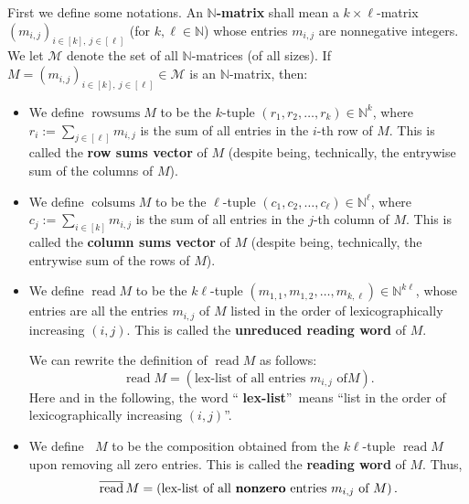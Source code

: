 \documentclass[12pt]{article}
\theoremstyle{definition}%
\theoremstyle{definition}%
\theoremstyle{remark}%
\newcommand{\interval}[1]{\left[ #1 \right]} %
\newcommand{\CM}{\mathcal{M}}
\newcommand{\rowsums}{\operatorname{rowsums}}
\newcommand{\colsums}{\operatorname{colsums}}
\newcommand{\readw}{\operatorname{read}}
\newcommand{\readb}{\mathop{\overline{\operatorname{read}}}}
\newcommand{\defin}[1]{\textbf{#1}}
\begin{document}
First we define some notations. An \defin{$\mathbb{N}$-matrix} shall mean a
$k\times\ell$-matrix $\left(  m_{i,j}\right)  _{i\in\interval{k}
,\ j\in\interval{\ell}}$ (for $k,\ell\in\mathbb{N}$) whose entries
$m_{i,j}$ are nonnegative integers. We let \defin{$\CM$} denote the set of all
$\mathbb{N}$-matrices (of all sizes). If $M=\left(  m_{i,j}\right)
_{i\in\interval{k}  ,\ j\in\interval{\ell}}\in\CM$ is an
$\mathbb{N}$-matrix, then:

\begin{itemize}
\item We define \defin{$\rowsums M$} to be the $k$-tuple $\left(
r_{1},r_{2},\ldots,r_{k}\right)  \in\mathbb{N}^{k}$, where $r_{i}:=\sum
_{j\in\interval{\ell}}m_{i,j}$ is the sum of all entries in the $i$-th
row of $M$. This is called the \defin{row sums vector} of $M$ (despite being,
technically, the entrywise sum of the columns of $M$).

\item We define \defin{$\colsums M$} to be the $\ell$-tuple $\left(
c_{1},c_{2},\ldots,c_{\ell}\right)  \in\mathbb{N}^{\ell}$, where $c_{j}
:=\sum_{i\in\interval{k}  }m_{i,j}$ is the sum of all entries in the
$j$-th column of $M$. This is called the \defin{column sums vector} of $M$
(despite being, technically, the entrywise sum of the rows of $M$).

\item We define \defin{$\readw M$} to be the $k\ell$-tuple $\left(
m_{1,1},m_{1,2},\ldots,m_{k,\ell}\right)  \in\mathbb{N}^{k\ell}$, whose
entries are all the entries $m_{i,j}$ of $M$ listed in the order of
lexicographically increasing $\left(  i,j\right)  $. This is called the
\defin{unreduced reading word} of $M$.

We can rewrite the definition of $\readw M$ as follows:
\begin{equation}
\readw M=\left(  \text{lex-list of all entries }m_{i,j}\text{ of
}M\right)  .
\label{eq.smf.readM=lex}
\end{equation}
Here and in the following, the word \textquotedblleft
\defin{lex-list}\textquotedblright\ means \textquotedblleft list in the order of
lexicographically increasing $\left(  i,j\right)  $\textquotedblright.

\item We define \defin{$\readb M$} to be the composition
obtained from the $k\ell$-tuple $\readw M$ upon removing all zero
entries. This is called the \defin{reading word} of $M$. Thus,
\begin{equation}
\readb M=\left(  \text{lex-list of all
\textbf{nonzero} entries }m_{i,j}\text{ of }M\right)  .
\label{eq.smf.readbM=lex}
\end{equation}

\end{itemize}
\end{document}

